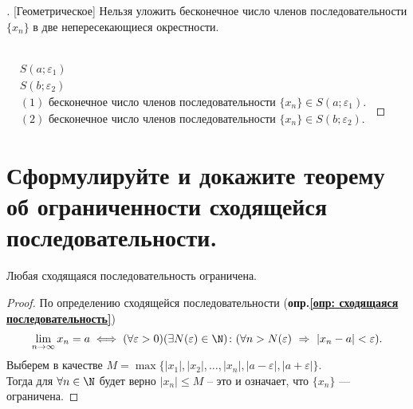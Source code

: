 \begin{proof}[][Геометрическое]
  Нельзя уложить бесконечное число членов последовательности $\{x_{n}\}$ в две непересекающиеся окрестности.\\[2ex]
  \\[2ex]
  $\begin{aligned}
    &S(a; \varepsilon_1)\\
    &S(b; \varepsilon_2)
  \end{aligned}$ \quad $\begin{aligned}
    &(1) \text{ бесконечное число членов последовательности } {\{x_n\}} \in S(a; \varepsilon_1). \\
    &(2) \text{ бесконечное число членов последовательности } {\{x_n\}} \in S(b; \varepsilon_2).
  \end{aligned}$
\end{proof}

\section{Сформулируйте и докажите теорему об ограниченности сходящейся последовательности.}

\begin{theorem}
    Любая сходящаяся последовательность ограничена. 
  \end{theorem}
  
\begin{proof}
    По определению сходящейся последовательности (\textbf{опр.\ref{опр: сходящаяся последовательность}})
    \vspace{-2pt}
    \begin{gather*}
         \lim_{n \to \infty} x_n = a \iff (\forall \varepsilon > 0)(\exists N(\varepsilon)\in \N)\colon (\forall n > N(\varepsilon)\ \Rightarrow\ |x_{n} - a| < \varepsilon).
    \end{gather*}
    Выберем в качестве $M = \max \{|x_{1}|, |x_2|, \ldots, |x_n|, |a - \varepsilon|, |a + \varepsilon|\}$. \\
    Тогда для $\forall n \in \N$ будет верно $|x_{n}| \le M$ -- это и означает, что $\{x_{n}\}$ --- ограничена.
\end{proof}
\newpage
